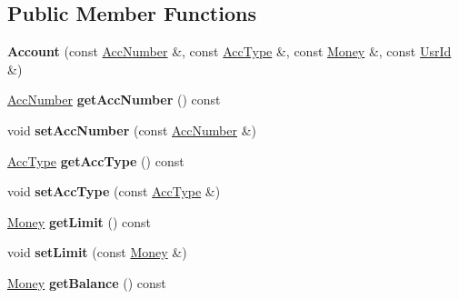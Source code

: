 \subsection*{Public Member Functions}
\begin{DoxyCompactItemize}
\item 
\hypertarget{classAccount_a26dcd22e552626c14728150a671608a1}{{\bfseries Account} (const \hyperlink{classAccNumber}{Acc\-Number} \&, const \hyperlink{classUsrType}{Acc\-Type} \&, const \hyperlink{classMoney}{Money} \&, const \hyperlink{classUsrId}{Usr\-Id} \&)}\label{classAccount_a26dcd22e552626c14728150a671608a1}

\item 
\hypertarget{classAccount_a74f26f24e13e66a055bb8441dfb3d881}{\hyperlink{classAccNumber}{Acc\-Number} {\bfseries get\-Acc\-Number} () const }\label{classAccount_a74f26f24e13e66a055bb8441dfb3d881}

\item 
\hypertarget{classAccount_a3e669090168f13d2a8269af456546a1e}{void {\bfseries set\-Acc\-Number} (const \hyperlink{classAccNumber}{Acc\-Number} \&)}\label{classAccount_a3e669090168f13d2a8269af456546a1e}

\item 
\hypertarget{classAccount_a34e1f7e507d7abdf575e4833d6f8d36b}{\hyperlink{classUsrType}{Acc\-Type} {\bfseries get\-Acc\-Type} () const }\label{classAccount_a34e1f7e507d7abdf575e4833d6f8d36b}

\item 
\hypertarget{classAccount_a3a8e8aa0094b2af0496d45714f694256}{void {\bfseries set\-Acc\-Type} (const \hyperlink{classUsrType}{Acc\-Type} \&)}\label{classAccount_a3a8e8aa0094b2af0496d45714f694256}

\item 
\hypertarget{classAccount_ac67a380f5f320a44f9bb464f6efd59f7}{\hyperlink{classMoney}{Money} {\bfseries get\-Limit} () const }\label{classAccount_ac67a380f5f320a44f9bb464f6efd59f7}

\item 
\hypertarget{classAccount_ada9bd7d0aee82d5b6c8f9831eb6fd8d5}{void {\bfseries set\-Limit} (const \hyperlink{classMoney}{Money} \&)}\label{classAccount_ada9bd7d0aee82d5b6c8f9831eb6fd8d5}

\item 
\hypertarget{classAccount_af9414bc748bf1923b2308544bbfd8b82}{\hyperlink{classMoney}{Money} {\bfseries get\-Balance} () const }\label{classAccount_af9414bc748bf1923b2308544bbfd8b82}


\end{DoxyCompactItemize}
